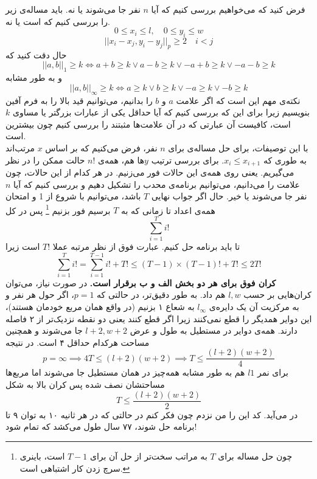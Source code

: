فرض کنید که می‌خواهیم بررسی کنیم که آیا $n$ نفر جا می‌شوند یا نه. باید مساله‌ی زیر را بررسی کنیم که  است یا نه.
\[
0 \le x_i \le l, \quad 0 \le y_i \le w\]\[
||x_i - x_j, y_i - y_j||_{p} \ge 2\quad i < j
\]
حال دقت کنید که 
\[
||a, b||_{1} \ge k \iff 
a + b \ge k \lor a - b\ge k \lor -a + b \ge k \lor -a - b \ge k
\]
و به طور مشابه
\[
||a, b||_{\infty} \ge k \iff 
a \ge k \lor b \ge k \lor -a \ge k \lor -b \ge k
\]
نکته‌ی مهم این است که اگر علامت $a$ و $b$ را بدانیم، می‌توانیم قید بالا را به فرم آفین بنویسیم زیرا برای این که بررسی کنیم که آیا حداقل یکی از عبارات بزرگتر یا مساوی $k$ است، کافیست آن عبارتی که در آن علامت‌ها مثبتند را بررسی کنیم چون بیشترین است.\\
با این توصیفات، برای حل مساله‌ی
برای $n$ نفر، فرض می‌کنیم که بر اساس $x$ مرتب‌اند به طوری که 
$x_i \le x_{i + 1}$.
برای بررسی ترتیب $y$‌ها هم، همه‌ی
$n!$
حالت ممکن را در نظر می‌گیریم. یعنی روی همه‌ی این حالات فور می‌زنیم. در هر کدام از این حالات، چون علامت را می‌دانیم، می‌توانیم برنامه‌ی محدب را تشکیل دهیم و بررسی کنیم که آیا $n$ نفر جا می‌شوند یا خیر. حال اگر جواب نهایی $T$ باشد، می‌توانیم با شروع از 1 و امتحان همه‌ی اعداد تا زمانی که به $T$ برسیم فور بزنیم 
\footnote{
	چون حل مساله برای $T$ به مراتب سخت‌تر از حل آن برای $T- 1$ است، باینری سرچ زدن کار اشتباهی است.
}
پس در کل
\[
\sum_{i=1}^{T}i! 
\]
تا باید برنامه حل کنیم. عبارت فوق از نظر مرتبه عملا $T!$ است زیرا
\[
\sum_{i=1}^{T}i! = \sum_{i=1}^{T-1}i! + T! \le (T-1)\times (T-1)! + T! \le 2T!
\]
\textbf{کران فوق برای هر دو بخش الف و ب برقرار است.}
در صورت نیاز، می‌توان کران‌هایی بر حسب $l, w$ هم داد. به طور دقیق‌تر، در حالتی که $p=1$، اگر حول هر نفر و به مرکزیت آن یک دایره‌ی
 $l_{\infty}$
 به شعاع ۱ بزنیم (در واقع همان مربع خودمان هستند)، این دوایر همدیگر را قطع نمی‌کنند زیرا اگر قطع کنند یعنی دو نقطه نزدیک‌تر از ۲ فاصله دارند. همه‌ی دوایر در مستطیل به طول و عرض
 $l+2, w+2$
 جا می‌شوند و همچنین مساحت هرکدام حداقل ۴ است. در نتیجه 
 \[
p = \infty \implies 4T \le (l+2)(w+2) \implies T \le \frac{(l+2)(w+2)}{4}
 \]
برای نمر $l1$ هم به طور مشابه همه‌چیز در همان مستطیل جا می‌شوند اما مربع‌ها مساحتشان نصف شده پس کران بالا به شکل
\[
T \le \frac{(l+2)(w+2)}{2}
\]
در می‌آید.
کد این را من نزدم چون فکر کنم در حالتی که در هر ثانیه ۱۰ به توان ۹ تا برنامه حل شوند، ۷۷ سال طول می‌کشد که تمام شود!